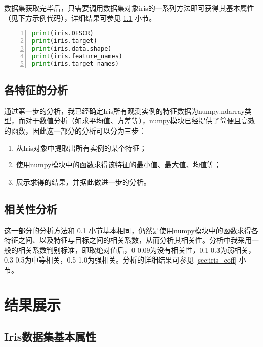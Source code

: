 \documentclass[12pt,a4paper]{article}
\theoremstyle{definition}
\begin{document}
\vspace{0.01\linewidth}
数据集获取完毕后，只需要调用数据集对象iris的一系列方法即可获得其基本属性（见下方示例代码），详细结果可参见 \ref{sec:iris_basic} 小节。
\vspace{0.01\linewidth}

\begin{lstlisting}[language=Python,
numbers=left,
keywordstyle=\color{blue!70},
frame=shadowbox,
breaklines=True]
print(iris.DESCR)
print(iris.target)
print(iris.data.shape)
print(iris.feature_names)
print(iris.target_names)
\end{lstlisting}

\subsection{各特征的分析}
\label{sec:app_attri}

通过第一步的分析，我已经确定Iris所有观测实例的特征数据为numpy.ndarray类型，而对于数值分析（如求平均值、方差等），numpy模块已经提供了简便且高效的函数，因此这一部分的分析可以分为三步：

\begin{enumerate}
	\item 从Iris对象中提取出所有实例的某个特征；
	
	\item 使用numpy模块中的函数求得该特征的最小值、最大值、均值等；
	
	\item 展示求得的结果，并据此做进一步的分析。
\end{enumerate}

\subsection{相关性分析}

这一部分的分析方法和 \ref{sec:app_attri} 小节基本相同，仍然是使用numpy模块中的函数求得各特征之间、以及特征与目标之间的相关系数，从而分析其相关性。分析中我采用一般的相关系数判别标准，即取绝对值后，0-0.09为没有相关性，0.1-0.3为弱相关，0.3-0.5为中等相关，0.5-1.0为强相关。分析的详细结果可参见 \ref{sec:iris_coff} 小节。

\section{结果展示}

\subsection{Iris数据集基本属性}
\label{sec:iris_basic}
\end{document}
